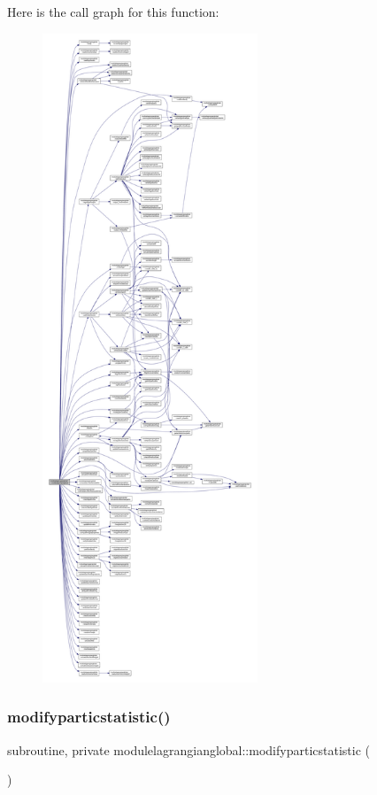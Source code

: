 Here is the call graph for this function\+:\nopagebreak
\begin{figure}[H]
\begin{center}
\leavevmode
\includegraphics[height=550pt]{namespacemodulelagrangianglobal_a658b1fd9232553dc9130f4f03e93e4c1_cgraph}
\end{center}
\end{figure}
\mbox{\label{namespacemodulelagrangianglobal_a3039668c6b76c0fdde5ffdc19ebdfe88}} 
\subsubsection{\texorpdfstring{modifyparticstatistic()}{modifyparticstatistic()}}
{\footnotesize\ttfamily subroutine, private modulelagrangianglobal\+::modifyparticstatistic (\begin{DoxyParamCaption}{ }\end{DoxyParamCaption})\hspace{0.3cm}{\ttfamily [private]}}

